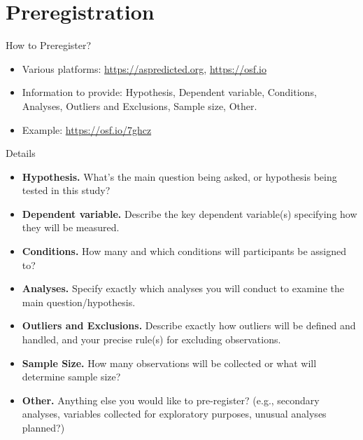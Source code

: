 \documentclass[
  ignorenonframetext,
  aspectratio=169,
]{beamer}
\providecommand{\tightlist}{%
  \setlength{\itemsep}{0pt}\setlength{\parskip}{0pt}}\usepackage{longtable,booktabs,array}
\begin{document}
\section{Preregistration}\label{preregistration-1}

\begin{frame}{How to Preregister?}
\label{how-to-preregister}
\begin{itemize}
\tightlist
\item
  Various platforms: \url{https://aspredicted.org}, \url{https://osf.io}
\item
  Information to provide: Hypothesis, Dependent variable, Conditions,
  Analyses, Outliers and Exclusions, Sample size, Other.
\item
  Example: \url{https://osf.io/7ghcz}
\end{itemize}
\end{frame}

\begin{frame}{Details}
\label{details}
\begin{itemize}
\tightlist
\item
  \textbf{Hypothesis.} What's the main question being asked, or
  hypothesis being tested in this study?
\item
  \textbf{Dependent variable.} Describe the key dependent variable(s)
  specifying how they will be measured.
\item
  \textbf{Conditions.} How many and which conditions will participants
  be assigned to?
\item
  \textbf{Analyses.} Specify exactly which analyses you will conduct to
  examine the main question/hypothesis.
\item
  \textbf{Outliers and Exclusions.} Describe exactly how outliers will
  be defined and handled, and your precise rule(s) for excluding
  observations.
\item
  \textbf{Sample Size.} How many observations will be collected or what
  will determine sample size?
\item
  \textbf{Other.} Anything else you would like to pre-register? (e.g.,
  secondary analyses, variables collected for exploratory purposes,
  unusual analyses planned?)
\end{itemize}
\end{frame}
\end{document}
